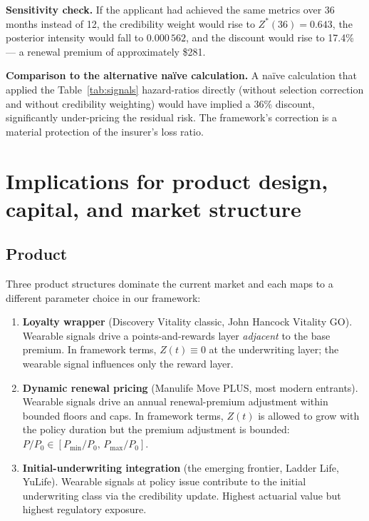 \documentclass[11pt,a4paper]{article}
\let\origsection\section
\renewcommand{\section}{\clearpage\origsection}
\theoremstyle{ia}
\newcommand{\1}{\mathbf{1}}
\begin{document}
\begin{ebox}
\textbf{Sensitivity check.}
If the applicant had achieved the same metrics over 36 months
instead of 12, the credibility weight would rise to
$Z^*(36)=0.643$, the posterior intensity would fall to
$0.000\,562$, and the discount would rise to 17.4\% --- a renewal
premium of approximately \$281.

\textbf{Comparison to the alternative naïve calculation.}
A naïve calculation that applied the Table~\ref{tab:signals}
hazard-ratios directly (without selection correction and without
credibility weighting) would have implied a 36\% discount,
significantly under-pricing the residual risk. The framework's
correction is a material protection of the insurer's loss ratio.
\end{ebox}

\section{Implications for product design, capital, and market structure}\label{sec:implications}

\subsection{Product}\label{ss:prod-impl}

Three product structures dominate the current market and each maps
to a different parameter choice in our framework:

\begin{enumerate}[leftmargin=*,nosep,topsep=4pt]
   \item \textbf{Loyalty wrapper} (Discovery Vitality
         classic, John Hancock Vitality GO).
         Wearable signals drive a points-and-rewards layer
         \emph{adjacent} to the base premium. In framework terms,
         $Z(t)\equiv 0$ at the underwriting layer; the wearable
         signal influences only the reward layer.
   \item \textbf{Dynamic renewal pricing} (Manulife Move PLUS,
         most modern entrants).
         Wearable signals drive an annual renewal-premium
         adjustment within bounded floors and caps. In framework
         terms, $Z(t)$ is allowed to grow with the policy duration
         but the premium adjustment is bounded:
         $P/P_0 \in [P_{\min}/P_0,\,P_{\max}/P_0]$.
   \item \textbf{Initial-underwriting integration} (the emerging
         frontier, Ladder Life, YuLife).
         Wearable signals at policy issue contribute to the initial
         underwriting class via the credibility update. Highest
         actuarial value but highest regulatory exposure.
\end{enumerate}
\end{document}
